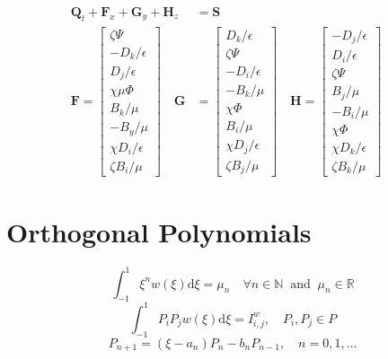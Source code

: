 \documentclass[12pt]{article}
\newcommand\rint[2]{\int^{1}_{-1}{#1} \mathrm{d}{#2}}
\begin{document}
	\begin{align}
		\mathbf{Q}_t + \mathbf{F}_x + \mathbf{G}_y + \mathbf{H}_z &= \mathbf{S} \\
		\mathbf{F} = 
			\begin{bmatrix}
     			\zeta \Psi \\
     			-D_k/\epsilon \\
     			D_j/\epsilon \\
     			\chi \mu \Phi  \\
     			B_k /\mu \\
     			-B_y/\mu \\
     			\chi D_i/\epsilon \\
     			\zeta B_i/\mu
     		\end{bmatrix} \quad
     	\mathbf{G} &= 
			\begin{bmatrix}
     			D_k/\epsilon \\
     			\zeta \Psi \\
     			-D_i/\epsilon \\
     			-B_k /\mu \\
     			\chi \Phi\\
     			B_i/\mu \\
     			\chi D_j/\epsilon \\
     			\zeta B_j/\mu
     		\end{bmatrix} \quad
     	\mathbf{H} = 
			\begin{bmatrix}
     			-D_j/\epsilon \\
     			D_i/\epsilon \\
				\zeta \Psi \\     			
     			B_j /\mu \\
     			-B_i/\mu \\
     			\chi \Phi \\
     			\chi D_k/\epsilon \\
     			\zeta B_k /\mu
     		\end{bmatrix} \quad
	\end{align}

\section{Orthogonal Polynomials}

\begin{equation}
		\rint{\xi^nw(\xi)}{\xi} = \mu_n \quad \forall n\in\mathbb{N} \;\; \mathrm{and} \;\; \mu_n\in\mathbb{R}
	\end{equation}
	\begin{equation}
		\rint{P_iP_jw(\xi)}{\xi} = I^w_{i,j}, \quad  P_i,P_j\in P
	\end{equation}
	\begin{equation}
		P_{n+1} = (\xi - a_n)P_n - b_nP_{n-1}, \quad n=0,1,\dots
	\end{equation}
\end{document}
